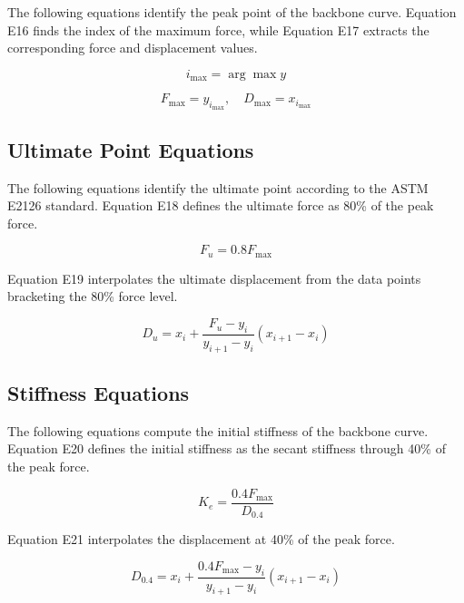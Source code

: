 \documentclass[11pt,a4paper]{article}
\begin{document}
The following equations identify the peak point of the backbone curve. Equation E16 finds the index of the maximum force, while Equation E17 extracts the corresponding force and displacement values.

\begin{equation}
i_{\max} = \arg\max y
\tag{E16}
\label{eq:E16}
\end{equation}

\begin{equation}
F_{\max} = y_{i_{\max}}, \quad D_{\max} = x_{i_{\max}}
\tag{E17}
\label{eq:E17}
\end{equation}

\subsection{Ultimate Point Equations}

The following equations identify the ultimate point according to the ASTM E2126 standard. Equation E18 defines the ultimate force as 80\% of the peak force.

\begin{equation}
F_u = 0.8 F_{\max}
\tag{E18}
\label{eq:E18}
\end{equation}

Equation E19 interpolates the ultimate displacement from the data points bracketing the 80\% force level.

\begin{equation}
D_u = x_i + \frac{F_u - y_i}{y_{i+1} - y_i} (x_{i+1} - x_i)
\tag{E19}
\label{eq:E19}
\end{equation}

\subsection{Stiffness Equations}

The following equations compute the initial stiffness of the backbone curve. Equation E20 defines the initial stiffness as the secant stiffness through 40\% of the peak force.

\begin{equation}
K_e = \frac{0.4 F_{\max}}{D_{0.4}}
\tag{E20}
\label{eq:E20}
\end{equation}

Equation E21 interpolates the displacement at 40\% of the peak force.

\begin{equation}
D_{0.4} = x_i + \frac{0.4 F_{\max} - y_i}{y_{i+1} - y_i} (x_{i+1} - x_i)
\tag{E21}
\label{eq:E21}
\end{equation}
\end{document}
